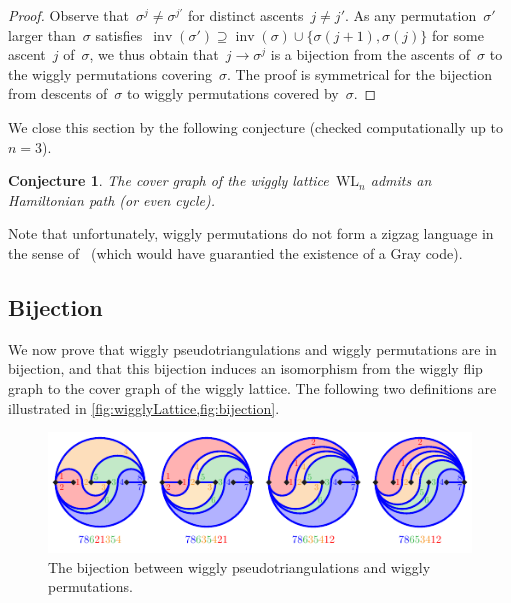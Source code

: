 \documentclass{amsart}
\newtheorem{conjecture}[theorem]{Conjecture}
\theoremstyle{definition}
\newcommand{\eqdef}{\mbox{\,\raisebox{0.2ex}{\scriptsize\ensuremath{\mathrm:}}\ensuremath{=}\,}} %
\DeclareMathOperator{\inv}{inv} %
\newcommand{\wigglyLattice}{\mathrm{WL}} %
\begin{document}
\begin{proof}
Observe that~$\sigma^j \ne \sigma^{j'}$ for distinct ascents~$j \ne j'$.
As any permutation~$\sigma'$ larger than~$\sigma$ satisfies~${\inv(\sigma') \supseteq \inv(\sigma) \cup \{\sigma(j+1), \sigma(j)\}}$ for some ascent~$j$ of~$\sigma$, we thus obtain that~$j \to \sigma^j$ is a bijection from the ascents of~$\sigma$ to the wiggly permutations covering~$\sigma$.
The proof is symmetrical for the bijection from descents of~$\sigma$ to wiggly permutations covered by~$\sigma$.
\end{proof}

We close this section by the following conjecture (checked computationally up to~$n = 3$).

\begin{conjecture}
\label{conj:Hamiltonian}
The cover graph of the wiggly lattice~$\wigglyLattice_n$ admits an Hamiltonian path (or even cycle).
\end{conjecture}

Note that unfortunately, wiggly permutations do not form a zigzag language in the sense of~\cite{HartungHoangMutzeWilliams} (which would have guarantied the existence of a Gray code).


\subsection{Bijection}
\label{subsec:bijection}

We now prove that wiggly pseudotriangulations and wiggly permutations are in bijection, and that this bijection induces an isomorphism from the wiggly flip graph to the cover graph of the wiggly lattice.
The following two definitions are illustrated in \cref{fig:wigglyLattice,fig:bijection}.

\begin{figure}
\centerline{\includegraphics[scale=1.7]{bijection}}
\caption{The bijection between wiggly pseudotriangulations and wiggly permutations.}
\label{fig:bijection}
\end{figure}
\end{document}

